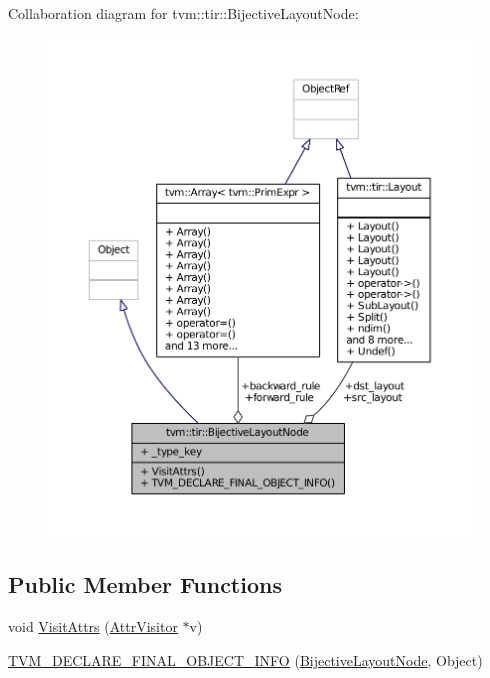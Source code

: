 Collaboration diagram for tvm\+:\+:tir\+:\+:Bijective\+Layout\+Node\+:
\nopagebreak
\begin{figure}[H]
\begin{center}
\leavevmode
\includegraphics[width=350pt]{classtvm_1_1tir_1_1BijectiveLayoutNode__coll__graph}
\end{center}
\end{figure}
\subsection*{Public Member Functions}
\begin{DoxyCompactItemize}
\item 
void \hyperlink{classtvm_1_1tir_1_1BijectiveLayoutNode_a58436540190348f9109940ccd4ffe5d7}{Visit\+Attrs} (\hyperlink{classtvm_1_1AttrVisitor}{Attr\+Visitor} $\ast$v)
\item 
\hyperlink{classtvm_1_1tir_1_1BijectiveLayoutNode_af8ad349a65471447162f2d0a5e9cc312}{T\+V\+M\+\_\+\+D\+E\+C\+L\+A\+R\+E\+\_\+\+F\+I\+N\+A\+L\+\_\+\+O\+B\+J\+E\+C\+T\+\_\+\+I\+N\+FO} (\hyperlink{classtvm_1_1tir_1_1BijectiveLayoutNode}{Bijective\+Layout\+Node}, Object)
\end{DoxyCompactItemize}
